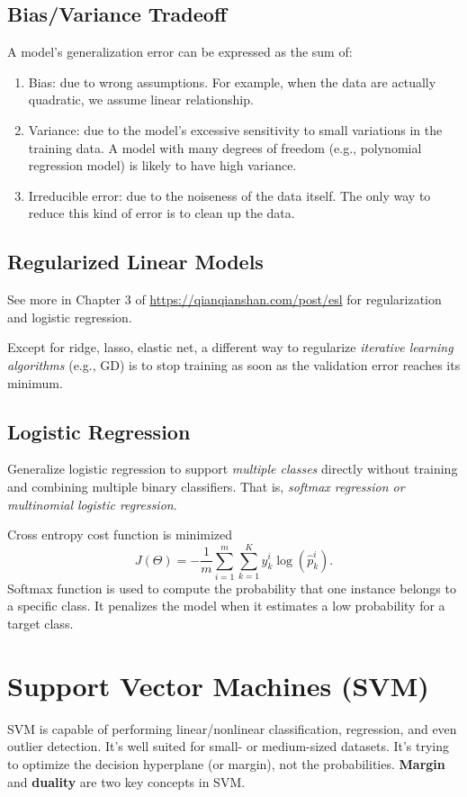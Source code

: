 \documentclass[12pt,oneside,a4paper]{article}
\numberwithin{equation}{section}
\begin{document}
\subsection{Bias/Variance Tradeoff}
A model's generalization error can be expressed as the sum of:

\begin{enumerate}
\item Bias: due to wrong assumptions. For example, when the data are actually quadratic, we assume linear relationship. 
\item Variance: due to the model's excessive sensitivity to small variations in the training data. A model with many degrees of freedom (e.g., polynomial regression model) is likely to have high variance. 
\item Irreducible error: due to the noiseness of the data itself. The only way to reduce this kind of error is to clean up the data. 
\end{enumerate}
\subsection{Regularized Linear Models}

See more in Chapter 3 of \href{https://qianqianshan.com/post/elementsofstatisticallearning/}{https://qianqianshan.com/post/esl} for regularization and logistic regression.


Except for ridge, lasso, elastic net, a different way to regularize \emph{iterative learning algorithms} (e.g., GD) is to stop training as soon as the validation error reaches its minimum.

\subsection{Logistic Regression}
Generalize logistic regression to support \emph{multiple classes} directly without training and combining multiple binary classifiers. That is, \emph{softmax regression or multinomial logistic regression}.

Cross entropy cost function is minimized 
\begin{equation}
J(\Theta) = - \frac{1}{m} \sum_{i=1}^{m} \sum_{k=1}^{K} y_k^{i} \log (\hat{p}_k^i).
\end{equation}
Softmax function is used to compute the probability that one instance belongs to a specific class. It penalizes the model when it estimates a low probability for a target class.


\section{Support Vector Machines (SVM)}
SVM is capable of performing linear/nonlinear classification, regression, and even outlier detection. It's well suited for small- or medium-sized datasets. It's trying to optimize the decision hyperplane (or margin), not the probabilities. \textbf{Margin} and \textbf{duality} are two key concepts in SVM.
\end{document}
